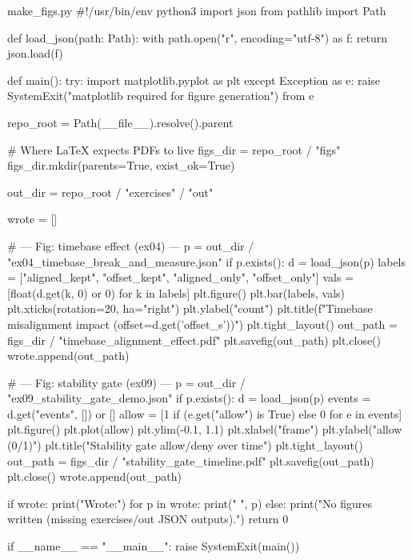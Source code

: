 \documentclass[11pt,openany]{book}
\begin{document}
\begin{filecontents*}{make_figs.py}
#!/usr/bin/env python3
import json
from pathlib import Path

def load_json(path: Path):
    with path.open("r", encoding="utf-8") as f:
        return json.load(f)

def main():
    try:
        import matplotlib.pyplot as plt
    except Exception as e:
        raise SystemExit("matplotlib required for figure generation") from e

    repo_root = Path(__file__).resolve().parent

    # Where LaTeX expects PDFs to live
    figs_dir = repo_root / "figs"
    figs_dir.mkdir(parents=True, exist_ok=True)

    out_dir = repo_root / "exercises" / "out"

    wrote = []

    # --- Fig: timebase effect (ex04) ---
    p = out_dir / "ex04_timebase_break_and_measure.json"
    if p.exists():
        d = load_json(p)
        labels = ["aligned_kept", "offset_kept", "aligned_only", "offset_only"]
        vals = [float(d.get(k, 0) or 0) for k in labels]
        plt.figure()
        plt.bar(labels, vals)
        plt.xticks(rotation=20, ha="right")
        plt.ylabel("count")
        plt.title(f"Timebase misalignment impact (offset={d.get('offset_s')})")
        plt.tight_layout()
        out_path = figs_dir / "timebase_alignment_effect.pdf"
        plt.savefig(out_path)
        plt.close()
        wrote.append(out_path)

    # --- Fig: stability gate (ex09) ---
    p = out_dir / "ex09_stability_gate_demo.json"
    if p.exists():
        d = load_json(p)
        events = d.get("events", []) or []
        allow = [1 if (e.get("allow") is True) else 0 for e in events]
        plt.figure()
        plt.plot(allow)
        plt.ylim(-0.1, 1.1)
        plt.xlabel("frame")
        plt.ylabel("allow (0/1)")
        plt.title("Stability gate allow/deny over time")
        plt.tight_layout()
        out_path = figs_dir / "stability_gate_timeline.pdf"
        plt.savefig(out_path)
        plt.close()
        wrote.append(out_path)

    if wrote:
        print("Wrote:")
        for p in wrote:
            print(" ", p)
    else:
        print("No figures written (missing exercises/out JSON outputs).")
    return 0

if __name__ == "__main__":
    raise SystemExit(main())
\end{filecontents*}
\end{document}
